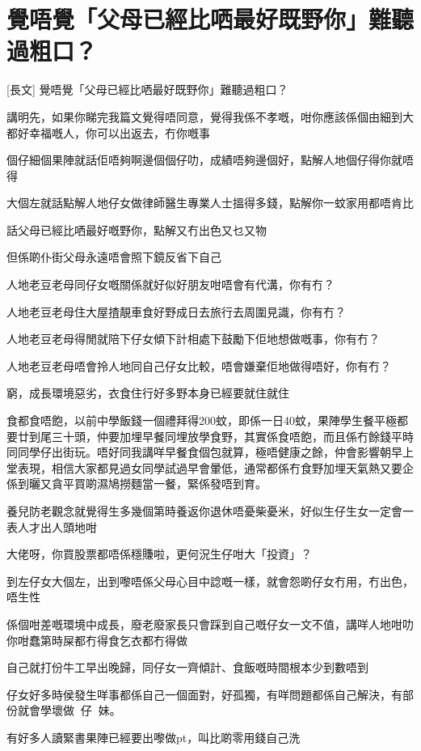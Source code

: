 \chapter{覺唔覺「父母已經比哂最好既野你」難聽過粗口？}

[長文] 覺唔覺「父母已經比哂最好既野你」難聽過粗口？

講明先，如果你睇完我篇文覺得唔同意，覺得我係不孝嘅，咁你應該係個由細到大都好幸福嘅人，你可以出返去，冇你嘅事

個仔細個果陣就話佢唔夠啊邊個個仔叻，成績唔夠邊個好，點解人地個仔得你就唔得

大個左就話點解人地仔女做律師醫生專業人士搵得多錢，點解你一蚊家用都唔肯比

話父母已經比哂最好嘅野你，點解又冇出色又乜又物

但係啲仆街父母永遠唔會照下鏡反省下自己

人地老豆老母同仔女嘅關係就好似好朋友咁唔會有代溝，你有冇？

人地老豆老母住大屋揸靚車食好野成日去旅行去周圍見識，你有冇？

人地老豆老母得閒就陪下仔女傾下計相處下鼓勵下佢地想做嘅事，你有冇？

人地老豆老母唔會拎人地同自己仔女比較，唔會嫌棄佢地做得唔好，你有冇？

窮，成長環境惡劣，衣食住行好多野本身已經要就住就住

食都食唔飽，以前中學飯錢一個禮拜得200蚊，即係一日40蚊，果陣學生餐平極都要廿到尾三十頭，仲要加埋早餐同埋放學食野，其實係食唔飽，而且係冇餘錢平時同同學仔出街玩。唔好同我講咩早餐食個包就算，極唔健康之餘，仲會影響朝早上堂表現，相信大家都見過女同學試過早會暈低，通常都係冇食野加埋天氣熱又要企係到曬又貪平買啲濕鳩撈麵當一餐，緊係發唔到育。

養兒防老觀念就覺得生多幾個第時養返你退休唔憂柴憂米，好似生仔生女一定會一表人才出人頭地咁

大佬呀，你買股票都唔係穩賺啦，更何況生仔咁大「投資」？

到左仔女大個左，出到嚟唔係父母心目中諗嘅一樣，就會怨啲仔女冇用，冇出色，唔生性

係個咁差嘅環境中成長，廢老廢家長只會踩到自己嘅仔女一文不值，講咩人地咁叻你咁蠢第時屎都冇得食乞衣都冇得做

自己就打份牛工早出晚歸，同仔女一齊傾計、食飯嘅時間根本少到數唔到

仔女好多時侯發生咩事都係自己一個面對，好孤獨，有咩問題都係自己解決，有部份就會學壞做仔妹。

有好多人讀緊書果陣已經要出嚟做pt，叫比啲零用錢自己洗

